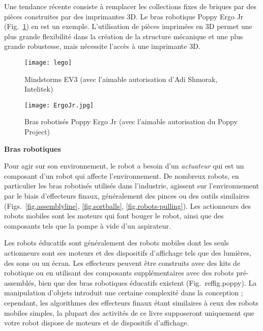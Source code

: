 {Une tendance récente consiste à remplacer les collections fixes de briques par des pièces construites par des imprimantes 3D. Le bras robotique Poppy Ergo Jr (Fig.~\ref{fig.poppy}) en est un exemple. L'utilisation de pièces imprimées en 3D permet une plus grande flexibilité dans la création de la structure mécanique et une plus grande robustesse, mais nécessite l'accès à une imprimante 3D. 

\begin{figure}
\begin{minipage}{.45\textwidth}
\begin{center}
\texttt{[image: lego]}
\end{center}
\caption{\lego{} Mindstorms EV3 (avec l'aimable autorisation d'Adi Shmorak, Intelitek)}
\label{fig.lego}
\end{minipage}
\hspace{\fill}
\begin{minipage}{.45\textwidth}
\begin{center}
\texttt{[image: ErgoJr.jpg]}
\end{center}
\caption{Bras robotisés Poppy Ergo Jr (avec l'aimable autorisation du Poppy Project)}
\label{fig.poppy}
\end{minipage}
\end{figure}


\noindent\textbf{Bras robotiques}

Pour agir sur son environnement, le robot a besoin d'un \emph{actuateur} qui est un composant d'un robot qui affecte l'environnement. De nombreux robots, en particulier les bras robotisés utilisés dans l'industrie, agissent sur l'environnement par le biais d'effecteurs finaux, généralement des pinces ou des outils similaires (Figs.~\ref{fig.assemblyline}, \ref{fig.sortballs}, \ref{fig.robots-pulling}). Les actionneurs des robots mobiles sont les moteurs qui font bouger le robot, ainsi que des composants tels que la pompe à vide d'un aspirateur.

Les robots éducatifs sont généralement des robots mobiles dont les seuls actionneurs sont ses moteurs et des dispositifs d'affichage tels que des lumières, des sons ou un écran. Les effecteurs peuvent être construits avec des kits de robotique ou en utilisant des composants supplémentaires avec des robots pré-assemblés, bien que des bras robotiques éducatifs existent (Fig.~ref{fig.poppy}). La manipulation d'objets introduit une certaine complexité dans la conception ; cependant, les algorithmes des effecteurs finaux étant similaires à ceux des robots mobiles simples, la plupart des activités de ce livre supposeront uniquement que votre robot dispose de moteurs et de dispositifs d'affichage.

}
